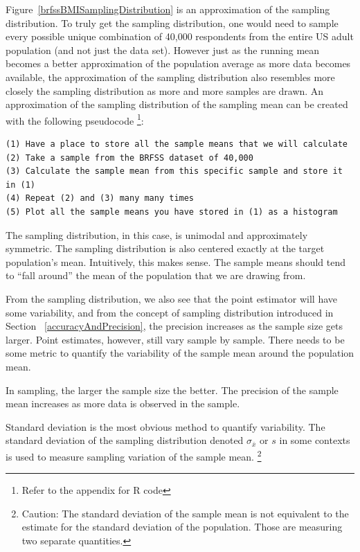 Figure~\ref{brfssBMISamplingDistribution} is an approximation of the sampling distribution. To truly get the sampling distribution, one would need to sample every possible unique combination of 40,000 respondents from the entire US adult population (and not just the  data set). However just as the running mean becomes a better approximation of the population average as more data becomes available, the approximation of the sampling distribution also resembles more closely the sampling distribution as more and more samples are drawn. An approximation of the sampling distribution of the sampling mean can be created with the following pseudocode \footnote{Refer to the appendix for R code}: 

\begin{verbatim}
(1) Have a place to store all the sample means that we will calculate
(2) Take a sample from the BRFSS dataset of 40,000
(3) Calculate the sample mean from this specific sample and store it in (1)
(4) Repeat (2) and (3) many many times 
(5) Plot all the sample means you have stored in (1) as a histogram
\end{verbatim}
  
The sampling distribution, in this case, is unimodal and approximately symmetric. The sampling distribution is also centered exactly at the target population's mean. Intuitively, this makes sense. The sample means should tend to ``fall around'' the mean of the population that we are drawing from.

From the sampling distribution, we also see that the point estimator will have some variability, and from the concept of sampling distribution introduced in Section ~\ref{accuracyAndPrecision}, the precision increases as the sample size gets larger. Point estimates, however, still vary sample by sample. There needs to be some metric to quantify the variability of the sample mean around the population mean.

\begin{tipBox}{
In sampling, the larger the sample size the better. The precision of the sample mean increases as more data is observed in the sample.}
\end{tipBox}

Standard deviation is the most obvious method to quantify variability. The standard deviation of the sampling distribution denoted  $\sigma_{\bar{x}}$ or $s$ in some contexts is used to measure sampling variation of the sample mean. \footnote{Caution: The standard deviation of the sample mean is not equivalent to the estimate for the standard deviation of the population. Those are measuring two separate quantities.}

